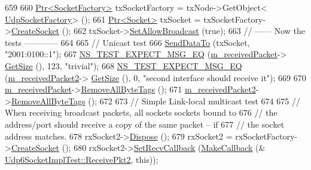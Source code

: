 \begin{DoxyCode}
659 
660   \hyperlink{classns3_1_1Ptr}{Ptr<SocketFactory>} txSocketFactory = txNode->GetObject<
      \hyperlink{classns3_1_1UdpSocketFactory}{UdpSocketFactory}> ();
661   \hyperlink{classns3_1_1Ptr}{Ptr<Socket>} txSocket = txSocketFactory->\hyperlink{classns3_1_1Socket_ad448a62bb50ad3dbac59c879a885a8d2}{CreateSocket} ();
662   txSocket->\hyperlink{classns3_1_1Socket_a32b4fa27b732a63207c8d9054a817ed5}{SetAllowBroadcast} (\textcolor{keyword}{true});
663   \textcolor{comment}{// ------ Now the tests ------------}
664 
665   \textcolor{comment}{// Unicast test}
666   \hyperlink{classUdp6SocketImplTest_a427d2e3289403cb472bd8414114d2894}{SendDataTo} (txSocket, \textcolor{stringliteral}{"2001:0100::1"});
667   \hyperlink{group__testing_ga7304ba46a28d8cf08dfdfd6499cf7068}{NS\_TEST\_EXPECT\_MSG\_EQ} (\hyperlink{classUdp6SocketImplTest_a0fe42d497152d2bbfa1660fbe5078c8a}{m\_receivedPacket}->
      \hyperlink{classns3_1_1Packet_a462855c9929954d4301a4edfe55f4f1c}{GetSize} (), 123, \textcolor{stringliteral}{"trivial"});
668   \hyperlink{group__testing_ga7304ba46a28d8cf08dfdfd6499cf7068}{NS\_TEST\_EXPECT\_MSG\_EQ} (\hyperlink{classUdp6SocketImplTest_a7bd5d6c237574c130414e505553bd13b}{m\_receivedPacket2}->
      \hyperlink{classns3_1_1Packet_a462855c9929954d4301a4edfe55f4f1c}{GetSize} (), 0, \textcolor{stringliteral}{"second interface should receive it"});
669 
670   \hyperlink{classUdp6SocketImplTest_a0fe42d497152d2bbfa1660fbe5078c8a}{m\_receivedPacket}->\hyperlink{classns3_1_1Packet_a083f54c9db31aeff30551a9e20fcda42}{RemoveAllByteTags} ();
671   \hyperlink{classUdp6SocketImplTest_a7bd5d6c237574c130414e505553bd13b}{m\_receivedPacket2}->\hyperlink{classns3_1_1Packet_a083f54c9db31aeff30551a9e20fcda42}{RemoveAllByteTags} ();
672 
673   \textcolor{comment}{// Simple Link-local multicast test}
674 
675   \textcolor{comment}{// When receiving broadcast packets, all sockets sockets bound to}
676   \textcolor{comment}{// the address/port should receive a copy of the same packet -- if}
677   \textcolor{comment}{// the socket address matches.}
678   rxSocket2->\hyperlink{classns3_1_1Object_aa90ae598863f6c251cdab3c3722afdaf}{Dispose} ();
679   rxSocket2 = rxSocketFactory->\hyperlink{classns3_1_1SocketFactory_a97351e6e7860503a4912042530449f62}{CreateSocket} ();
680   rxSocket2->\hyperlink{classns3_1_1Socket_a243f7835ef1a85f9270fd3577e3a40da}{SetRecvCallback} (\hyperlink{group__makecallbackmemptr_ga9376283685aa99d204048d6a4b7610a4}{MakeCallback} (&
      \hyperlink{classUdp6SocketImplTest_a66285083e8cd6b7884b63ca89282419a}{Udp6SocketImplTest::ReceivePkt2}, \textcolor{keyword}{this}));

\end{DoxyCode}
